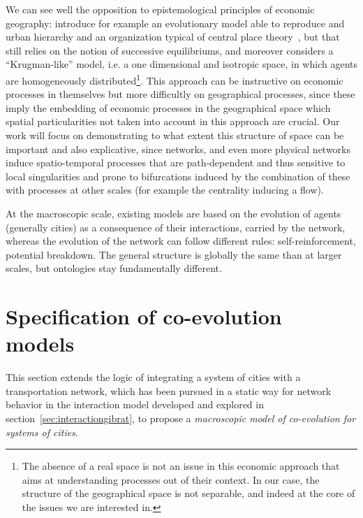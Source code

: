We can see well the opposition to epistemological principles of economic geography: \cite{fujita1999evolution} introduce for example an evolutionary model able to reproduce and urban hierarchy and an organization typical of central place theory~\cite{banos2011christaller}, but that still relies on the notion of successive equilibriums, and moreover considers a ``Krugman-like'' model, i.e. a one dimensional and isotropic space, in which agents are homogeneously distributed\footnote{The absence of a real space is not an issue in this economic approach that aims at understanding processes out of their context. In our case, the structure of the geographical space is not separable, and indeed at the core of the issues we are interested in.}. This approach can be instructive on economic processes in themselves but more difficultly on geographical processes, since these imply the embedding of economic processes in the geographical space which spatial particularities not taken into account in this approach are crucial. Our work will focus on demonstrating to what extent this structure of space can be important and also explicative, since networks, and even more physical networks induce spatio-temporal processes that are path-dependent and thus sensitive to local singularities and prone to bifurcations induced by the combination of these with processes at other scales (for example the centrality inducing a flow).


At the macroscopic scale, existing models are based on the evolution of agents (generally cities) as a consequence of their interactions, carried by the network, whereas the evolution of the network can follow different rules: self-reinforcement, potential breakdown. The general structure is globally the same than at larger scales, but ontologies stay fundamentally different.





\section{Specification of co-evolution models}

This section extends the logic of integrating a system of cities with a transportation network, which has been pursued in a static way for network behavior in the interaction model developed and explored in section~\ref{sec:interactiongibrat}, to propose a \emph{macroscopic model of co-evolution for systems of cities}.


